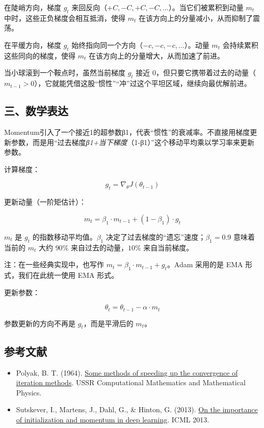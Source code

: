 在陡峭方向，梯度 \(g_t\) 来回反向（\(+C, -C, +C, -C, \ldots\)）。当它们被累积到动量 \(m_t\) 中时，这些正负梯度会相互抵消，使得 \(m_t\) 在该方向上的分量减小，从而抑制了震荡。

在平缓方向，梯度 \(g_t\) 始终指向同一个方向（\(-c, -c, -c, \ldots\)）。动量 \(m_t\) 会持续累积这些同向的梯度，使得 \(m_t\) 在该方向上的分量增大，从而加速了前进。

当小球滚到一个鞍点时，虽然当前梯度 \(g_t\) 接近 \(0\)，但只要它携带着过去的动量（\(m_{t-1}>0\)），它就能凭借这股``惯性''``冲''过这个平坦区域，继续向最优解前进。

\hypertarget{ux4e09ux6570ux5b66ux8868ux8fbe}{%
\subsection{三、数学表达}\label{ux4e09ux6570ux5b66ux8868ux8fbe}}

Momentum引入了一个接近1的超参数β1，代表``惯性''的衰减率。不直接用梯度更新参数，而是用``过去梯度\emph{β1+当下梯度}（1-β1）''这个移动平均乘以学习率来更新参数。

计算梯度：

\[
g_t = \nabla_\theta J(\theta_{t-1})
\]

更新动量（一阶矩估计）：

\[
m_t = \beta_1 \cdot m_{t-1} + (1-\beta_1)\cdot g_t
\]

\(m_t\) 是 \(g_t\) 的指数移动平均值。\(\beta_1\) 决定了过去梯度的``遗忘''速度；\(\beta_1=0.9\) 意味着当前的 \(m_t\) 大约 \(90\%\) 来自过去的动量，\(10\%\) 来自当前梯度。

注：在一些经典实现中，也写作 \(m_t=\beta_1\cdot m_{t-1}+g_t\)。Adam 采用的是 EMA 形式，我们在此统一使用 EMA 形式。

更新参数：

\[
\theta_t = \theta_{t-1} - \alpha \cdot m_t
\]

参数更新的方向不再是 \(g_t\)，而是平滑后的 \(m_t\)。

\FloatBarrier
{}
\hypertarget{ux53c2ux8003ux6587ux732e-26}{%
\subsection{参考文献}\label{ux53c2ux8003ux6587ux732e-26}}

\vspace{0.25em}
\begin{itemize}
\tightlist
\item
  Polyak, B. T. (1964). \href{https://doi.org/10.1016/0041-5553(64)90137-5}{Some methods of speeding up the convergence of iteration methods}. USSR Computational Mathematics and Mathematical Physics.
\item
  Sutskever, I., Martens, J., Dahl, G., \& Hinton, G. (2013). \href{https://proceedings.mlr.press/v28/sutskever13.html}{On the importance of initialization and momentum in deep learning}. ICML 2013.
\end{itemize}

\clearpage

